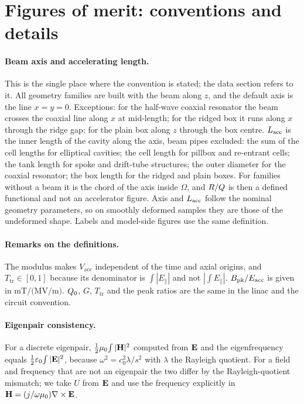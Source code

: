 \section{Figures of merit: conventions and details}\label{sec:A03-qoi}
\paragraph{Beam axis and accelerating length.}
This is the single place where the convention is stated; the data section refers to it. All geometry families are built with the beam along $z$, and the default axis is the line $x=y=0$.
Exceptions: for the half-wave coaxial resonator the beam crosses the coaxial line along $x$ at mid-length; for the ridged box it runs along $x$ through the ridge gap; for the plain box along $z$
through the box centre. $\Lacc$ is the inner length of the cavity along the axis, beam pipes excluded: the sum of the cell lengths for elliptical cavities; the cell length for pillbox and re-entrant
cells; the tank length for spoke and drift-tube structures; the outer diameter for the coaxial resonator; the box length for the ridged and plain boxes. For families without a beam it is the chord
of the axis inside $\Omega$, and $R/Q$ is then a defined functional and not an accelerator figure. Axis and $\Lacc$ follow the nominal geometry parameters, so on smoothly deformed samples they
are those of the undeformed shape. Labels and model-side figures use the same definition.

\paragraph{Remarks on the definitions.}
The modulus makes $V_{\mathrm{acc}}$ independent of the time and axial origins, and $T_{\mathrm{tr}}\in[0,1]$ because its denominator is $\int|E_\parallel|$ and not $|\int E_\parallel|$.
$\Bpk/\Eacc$ is given in $\si{\milli\tesla\per(\mega\volt\per\metre)}$. $\Qz$, $G$, $T_{\mathrm{tr}}$ and the peak ratios are the same in the linac and the circuit convention. %

\paragraph{Eigenpair consistency.}
For a discrete eigenpair, $\tfrac12\mu_0\!\int|\mathbf{H}|^2$ computed from $\mathbf{E}$ and the eigenfrequency equals $\tfrac12\varepsilon_0\!\int|\mathbf{E}|^2$, because
$\omega^2=c_0^2\lambda/s^2$ with $\lambda$ the Rayleigh quotient. For a field and frequency that are not an eigenpair the two differ by the
Rayleigh-quotient mismatch; we take $U$ from $\mathbf{E}$ and use the frequency explicitly in $\mathbf{H}=(j/\omega\mu_0)\nabla\times\mathbf{E}$.

